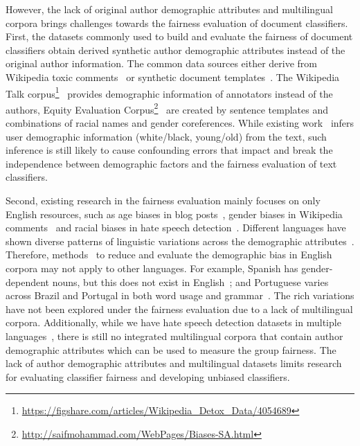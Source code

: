 However, the lack of original author demographic attributes and multilingual corpora brings challenges towards the fairness evaluation of document classifiers.
First, the datasets commonly used to build and evaluate the fairness of document classifiers obtain derived synthetic author demographic attributes instead of the original author information.
The common data sources either derive from Wikipedia toxic comments~\cite{dixon2018measuring, park2018reducing, garg2019counterfactual} or synthetic document templates~\cite{kiritchenko2018examining, park2018reducing, burke2018synthetic}.
The Wikipedia Talk corpus\footnote{\url{https://figshare.com/articles/Wikipedia_Detox_Data/4054689}}~\cite{wulczyn2017ex} provides demographic information of annotators instead of the authors, Equity Evaluation Corpus\footnote{\url{http://saifmohammad.com/WebPages/Biases-SA.html}}~\cite{kiritchenko2018examining} are created by sentence templates and combinations of racial names and gender coreferences.
While existing work~\cite{davidson2019racial, diaz2018addressing} infers user demographic information (white/black, young/old) from the text, such inference is still likely to cause confounding errors that impact and break the independence between demographic factors and the fairness evaluation of text classifiers.

Second, existing research in the fairness evaluation mainly focuses on only English resources, such as age biases in blog posts~\cite{diaz2018addressing}, gender biases in Wikipedia comments~\cite{dixon2018measuring} and racial biases in hate speech detection~\cite{davidson2019racial}.
Different languages have shown diverse patterns of linguistic variations across the demographic attributes~\cite{johannsen2015cross, huang2019neural}.
Therefore, methods~\cite{zhao2017men, park2018reducing} to reduce and evaluate the demographic bias in English corpora may not apply to other languages. 
For example, Spanish has gender-dependent nouns, but this does not exist in English~\cite{sun2019mitigating}; and Portuguese varies across Brazil and Portugal in both word usage and grammar~\cite{maier2014language}.
The rich variations have not been explored under the fairness evaluation due to a lack of multilingual corpora.
Additionally, while we have hate speech detection datasets in multiple languages~\cite{waseem2016hateful, sanguinetti2018italian, ptaszynski2017learning, basile2019semeval, fortuna2019hierarchically}, there is still no integrated multilingual corpora that contain author demographic attributes which can be used to measure the group fairness.
The lack of author demographic attributes and multilingual datasets limits research for evaluating classifier fairness and developing unbiased classifiers.


